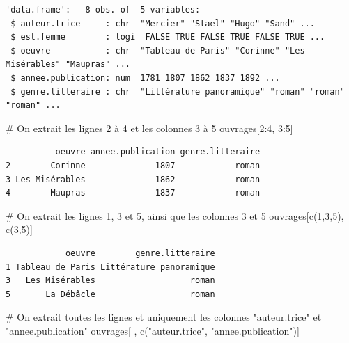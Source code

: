 \documentclass[
  letterpaper,
  DIV=11,
  numbers=noendperiod]{scrartcl}
\newenvironment{Shaded}{\begin{snugshade}}{\end{snugshade}}
\newcommand{\CommentTok}[1]{\textcolor[rgb]{0.37,0.37,0.37}{#1}}
\newcommand{\DecValTok}[1]{\textcolor[rgb]{0.68,0.00,0.00}{#1}}
\newcommand{\FunctionTok}[1]{\textcolor[rgb]{0.28,0.35,0.67}{#1}}
\newcommand{\NormalTok}[1]{\textcolor[rgb]{0.00,0.23,0.31}{#1}}
\newcommand{\SpecialCharTok}[1]{\textcolor[rgb]{0.37,0.37,0.37}{#1}}
\newcommand{\StringTok}[1]{\textcolor[rgb]{0.13,0.47,0.30}{#1}}
\begin{document}
\begin{verbatim}
'data.frame':   8 obs. of  5 variables:
 $ auteur.trice     : chr  "Mercier" "Stael" "Hugo" "Sand" ...
 $ est.femme        : logi  FALSE TRUE FALSE TRUE FALSE TRUE ...
 $ oeuvre           : chr  "Tableau de Paris" "Corinne" "Les Misérables" "Maupras" ...
 $ annee.publication: num  1781 1807 1862 1837 1892 ...
 $ genre.litteraire : chr  "Littérature panoramique" "roman" "roman" "roman" ...
\end{verbatim}

\begin{Shaded}
\begin{Highlighting}[]
\CommentTok{\# On extrait les lignes 2 à 4 et les colonnes 3 à 5}
\NormalTok{ouvrages[}\DecValTok{2}\SpecialCharTok{:}\DecValTok{4}\NormalTok{, }\DecValTok{3}\SpecialCharTok{:}\DecValTok{5}\NormalTok{]}
\end{Highlighting}
\end{Shaded}

\begin{verbatim}
          oeuvre annee.publication genre.litteraire
2        Corinne              1807            roman
3 Les Misérables              1862            roman
4        Maupras              1837            roman
\end{verbatim}

\begin{Shaded}
\begin{Highlighting}[]
\CommentTok{\# On extrait les lignes 1, 3 et 5, ainsi que les colonnes 3 et 5}
\NormalTok{ouvrages[}\FunctionTok{c}\NormalTok{(}\DecValTok{1}\NormalTok{,}\DecValTok{3}\NormalTok{,}\DecValTok{5}\NormalTok{), }\FunctionTok{c}\NormalTok{(}\DecValTok{3}\NormalTok{,}\DecValTok{5}\NormalTok{)]}
\end{Highlighting}
\end{Shaded}

\begin{verbatim}
            oeuvre        genre.litteraire
1 Tableau de Paris Littérature panoramique
3   Les Misérables                   roman
5       La Débâcle                   roman
\end{verbatim}

\begin{Shaded}
\begin{Highlighting}[]
\CommentTok{\# On extrait toutes les lignes et uniquement les colonnes "auteur.trice" et "annee.publication"}
\NormalTok{ouvrages[ , }\FunctionTok{c}\NormalTok{(}\StringTok{"auteur.trice"}\NormalTok{, }\StringTok{"annee.publication"}\NormalTok{)]}
\end{Highlighting}
\end{Shaded}
\end{document}
